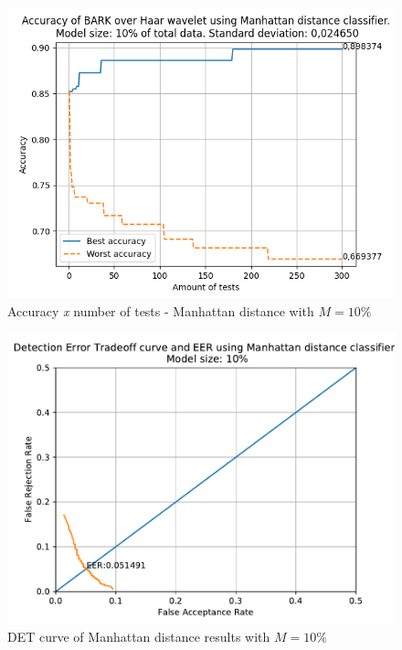 \begin{figure}[H]
\centering
\includegraphics[scale=.6]{images/results/confusionMatrices/classifier_Manhattan_10.png}
\caption{Accuracy \textit{x} number of tests - Manhattan distance with $M=10\%$}
\label{fig:classifiermanhattan10}
\end{figure}
\begin{figure}[H]
\centering
\includegraphics[scale=.6]{images/results/det/DET_for_classifier_Manhattan_10}
\caption{DET curve of Manhattan distance results with $M=10\%$}
\label{fig:detforclassifiermanhattan10}
\end{figure}
